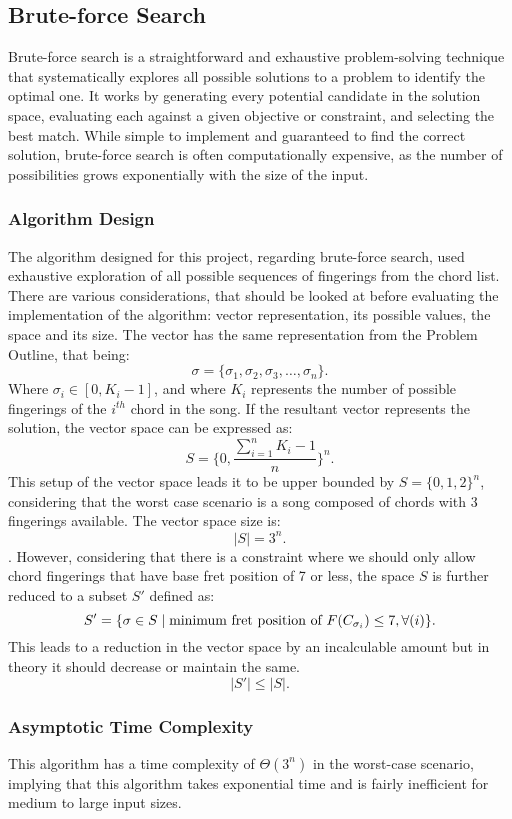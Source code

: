 \documentclass[conference]{IEEEtran}
\begin{document}
\subsection{Brute-force Search}
Brute-force search is a straightforward and exhaustive problem-solving technique that systematically explores all possible solutions to a problem to identify the optimal one. It works by generating every potential candidate in the solution space, evaluating each against a given objective or constraint, and selecting the best match. While simple to implement and guaranteed to find the correct solution, brute-force search is often computationally expensive, as the number of possibilities grows exponentially with the size of the input. 
\subsubsection{Algorithm Design}
The algorithm designed for this project, regarding brute-force search, used exhaustive exploration of all possible sequences of fingerings from the chord list. 
There are various considerations, that should be looked at before evaluating the implementation of the algorithm: vector representation, its possible values, the space and its size.
\newline 
\noindent The vector has the same representation from the Problem Outline, that being: \[ \sigma = \{\sigma_1, \sigma_2, \sigma_3, \ldots, \sigma_n\}. \] 
\indent Where \(\sigma_i \in [0, K_i - 1]\), and where \( K_i \) represents the number of possible fingerings of the $i^{th}$ chord in the song. If the resultant vector represents the solution, the vector space can be expressed as:
\[ S = \{0, \frac{\sum_{i=1}^{n}K_i - 1}{n} \}^{n}. \]
\indent This setup of the vector space leads it to be upper bounded by \( S = \{0,1,2\}^{n} \), considering that the worst case scenario is a song composed of chords with $3$ fingerings available. The vector space size is:
\[ |S| = 3^{n}. \].
\indent However, considering that there is a constraint where we should only allow chord fingerings that have base fret position of 7 or less, the space $S$ is further reduced to a subset $S'$ defined as:
\[ S' = \{\sigma \in S \mid \text{minimum fret position of \( F(C_{\sigma_i}) \)} \leq 7, \forall(i)\}. \]
\indent This leads to a reduction in the vector space by an incalculable amount but in theory it should decrease or maintain the same.
\[ |S'| \leq |S|. \]

\subsubsection{Asymptotic Time Complexity}
This algorithm has a time complexity of \(\Theta(3^{n})\) in the worst-case scenario, implying that this algorithm takes exponential time and is fairly inefficient for medium to large input sizes.  
\end{document}
